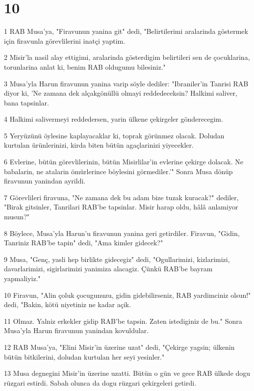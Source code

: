 \chapter{10}

\par 1 RAB Musa'ya, "Firavunun yanina git" dedi, "Belirtilerimi aralarinda göstermek için firavunla görevlilerini inatçi yaptim.
\par 2 Misir'la nasil alay ettigimi, aralarinda gösterdigim belirtileri sen de çocuklarina, torunlarina anlat ki, benim RAB oldugumu bilesiniz."
\par 3 Musa'yla Harun firavunun yanina varip söyle dediler: "Ibraniler'in Tanrisi RAB diyor ki, 'Ne zamana dek alçakgönüllü olmayi reddedeceksin? Halkimi saliver, bana tapsinlar.
\par 4 Halkimi salivermeyi reddedersen, yarin ülkene çekirgeler gönderecegim.
\par 5 Yeryüzünü öylesine kaplayacaklar ki, toprak görünmez olacak. Doludan kurtulan ürünlerinizi, kirda biten bütün agaçlarinizi yiyecekler.
\par 6 Evlerine, bütün görevlilerinin, bütün Misirlilar'in evlerine çekirge dolacak. Ne babalarin, ne atalarin ömürlerince böylesini görmediler.'" Sonra Musa dönüp firavunun yanindan ayrildi.
\par 7 Görevlileri firavuna, "Ne zamana dek bu adam bize tuzak kuracak?" dediler, "Birak gitsinler, Tanrilari RAB'be tapsinlar. Misir harap oldu, hâlâ anlamiyor musun?"
\par 8 Böylece, Musa'yla Harun'u firavunun yanina geri getirdiler. Firavun, "Gidin, Tanriniz RAB'be tapin" dedi, "Ama kimler gidecek?"
\par 9 Musa, "Genç, yasli hep birlikte gidecegiz" dedi, "Ogullarimizi, kizlarimizi, davarlarimizi, sigirlarimizi yanimiza alacagiz. Çünkü RAB'be bayram yapmaliyiz."
\par 10 Firavun, "Alin çoluk çocugunuzu, gidin gidebilirseniz, RAB yardimciniz olsun!" dedi, "Bakin, kötü niyetiniz ne kadar açik.
\par 11 Olmaz. Yalniz erkekler gidip RAB'be tapsin. Zaten istediginiz de bu." Sonra Musa'yla Harun firavunun yanindan kovuldular.
\par 12 RAB Musa'ya, "Elini Misir'in üzerine uzat" dedi, "Çekirge yagsin; ülkenin bütün bitkilerini, doludan kurtulan her seyi yesinler."
\par 13 Musa degnegini Misir'in üzerine uzatti. Bütün o gün ve gece RAB ülkede dogu rüzgari estirdi. Sabah olunca da dogu rüzgari çekirgeleri getirdi.
